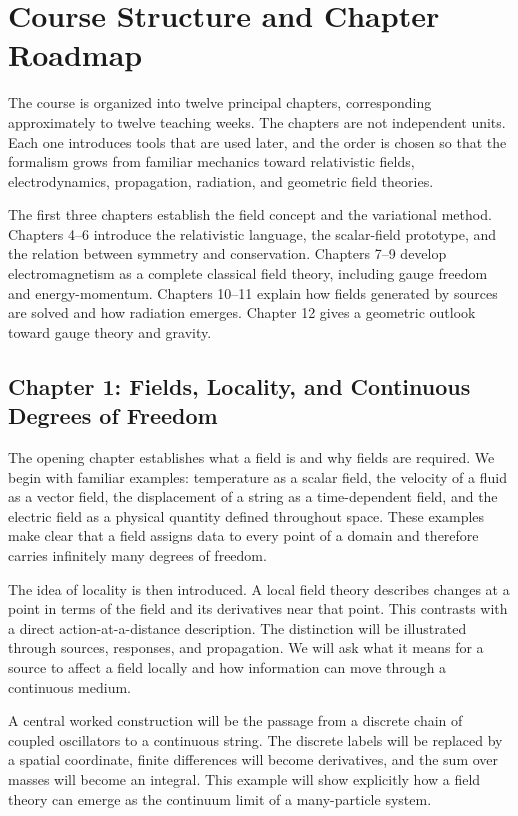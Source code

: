 \section*{Course Structure and Chapter Roadmap}

The course is organized into twelve principal chapters, corresponding approximately to twelve teaching weeks. The chapters are not independent units. Each one introduces tools that are used later, and the order is chosen so that the formalism grows from familiar mechanics toward relativistic fields, electrodynamics, propagation, radiation, and geometric field theories.

The first three chapters establish the field concept and the variational method. Chapters 4--6 introduce the relativistic language, the scalar-field prototype, and the relation between symmetry and conservation. Chapters 7--9 develop electromagnetism as a complete classical field theory, including gauge freedom and energy-momentum. Chapters 10--11 explain how fields generated by sources are solved and how radiation emerges. Chapter 12 gives a geometric outlook toward gauge theory and gravity.

\subsection*{Chapter 1: Fields, Locality, and Continuous Degrees of Freedom}

The opening chapter establishes what a field is and why fields are required. We begin with familiar examples: temperature as a scalar field, the velocity of a fluid as a vector field, the displacement of a string as a time-dependent field, and the electric field as a physical quantity defined throughout space. These examples make clear that a field assigns data to every point of a domain and therefore carries infinitely many degrees of freedom.

The idea of locality is then introduced. A local field theory describes changes at a point in terms of the field and its derivatives near that point. This contrasts with a direct action-at-a-distance description. The distinction will be illustrated through sources, responses, and propagation. We will ask what it means for a source to affect a field locally and how information can move through a continuous medium.

A central worked construction will be the passage from a discrete chain of coupled oscillators to a continuous string. The discrete labels will be replaced by a spatial coordinate, finite differences will become derivatives, and the sum over masses will become an integral. This example will show explicitly how a field theory can emerge as the continuum limit of a many-particle system.

